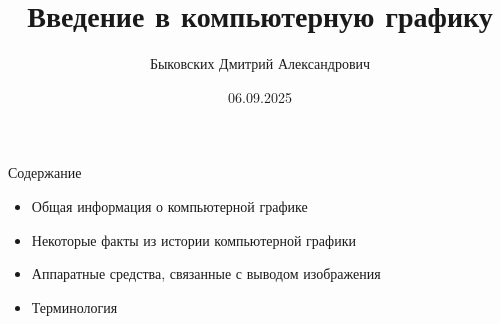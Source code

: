 \documentclass{beamer}
\title[Введение в КГ]{Введение в компьютерную графику}
\author[Быковских Д.А.]{Быковских Дмитрий Александрович}
\date{06.09.2025}
\begin{document}
	\begin{frame}
		\titlepage

	\end{frame}
	\begin{frame}{Содержание}
		\begin{itemize}
			\item 
			Общая информация о компьютерной графике
			\item
			Некоторые факты из истории компьютерной графики
			\item
			Аппаратные средства, связанные с выводом изображения
			\item 
			Терминология
		\end{itemize}
	\end{frame}
\end{document}
